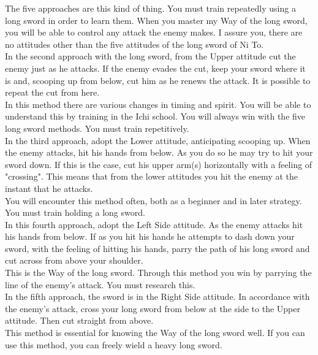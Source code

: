 The five approaches are this kind of thing. You must train repeatedly using a long sword in order to learn them. When you master my Way of the long sword, you will be able to control any attack the enemy makes. I assure you, there are no attitudes other than the five attitudes of the long sword of Ni To.\\

    In the second approach with the long sword, from the Upper attitude cut the enemy just as he attacks. If the enemy evades the cut, keep your sword where it is and, scooping up from below, cut him as he renews the attack. It is possible to repeat the cut from here. \\

In this method there are various changes in timing and spirit. You will be able to understand this by training in the Ichi school. You will always win with the five long sword methods. You must train repetitively.\\

    In the third approach, adopt the Lower attitude, anticipating scooping up. When the enemy attacks, hit his hands from below. As you do so he may try to hit your sword down. If this is the case, cut his upper arm(s) horizontally with a feeling of "crossing". This means that from the lower attitudes you hit the enemy at the instant that he attacks. \\

You will encounter this method often, both as a beginner and in later strategy. You must train holding a long sword.\\

    In this fourth approach, adopt the Left Side attitude. As the enemy attacks hit his hands from below. If as you hit his hands he attempts to dash down your sword, with the feeling of hitting his hands, parry the path of his long sword and cut across from above your shoulder. \\

This is the Way of the long sword. Through this method you win by parrying the line of the enemy's attack. You must research this.\\

    In the fifth approach, the sword is in the Right Side attitude. In accordance with the enemy's attack, cross your long sword from below at the side to the Upper attitude. Then cut straight from above. \\

This method is essential for knowing the Way of the long sword well. If you can use this method, you can freely wield a heavy long sword.\\

